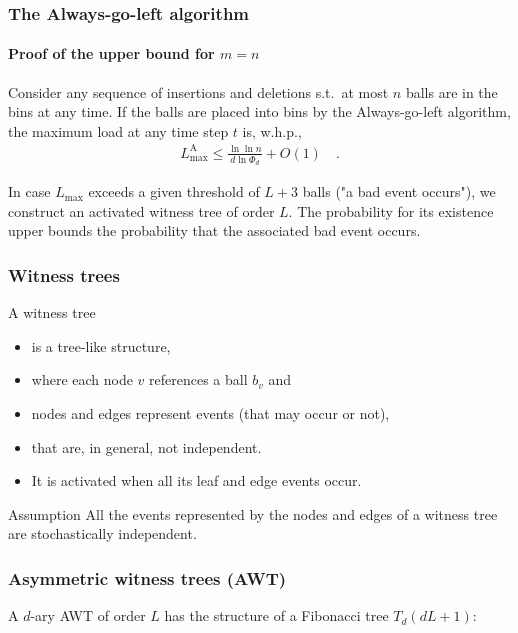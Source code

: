 \documentclass[serif,professionalfonts]{beamer}
\newcommand\load{L_{\mathrm{max}}}
\newcommand\loadAgl{\load^{\mathrm{A}}}
\begin{document}
\begin{frame}
\frametitle{The Always-go-left algorithm}
\framesubtitle{Proof of the upper bound for $m=n$}
\begin{theorem}[V\"ocking, 2003]
\label{theorem:aglm}
Consider any sequence of insertions and deletions s.t.~at most $n$ balls are in the bins at any time. If the balls are placed into bins by the Always-go-left algorithm, the maximum load at any time step $t$ is, w.h.p., 
\begin{align*}
\loadAgl \leq \frac{\ln\ln n}{d  \ln \Phi_d} + O(1) \quad .
\end{align*}
\end{theorem}

\pause
\bigskip
In case $\load$ exceeds a given threshold of $L+3$ balls ("a bad event occurs"), we construct an activated \alert{witness tree of order $L$}. The probability for its existence upper bounds the probability that the associated bad event occurs.  
\end{frame}

\newcommand\assumptionOne{
\begin{alertblock}{Assumption}
All the events represented by the nodes and edges of a witness tree are stochastically independent. 
\end{alertblock}
}

\begin{frame}
\frametitle{Witness trees}
A witness tree
\begin{itemize}
\item is a \alert{tree-like structure},
\item where each node $v$ references a ball $b_v$ and
\item nodes and edges represent \alert{events} (that may occur or not),
\item that are, in general, \alert{not independent}.
\item It is \alert{activated} when all its leaf and edge events occur. 
\end{itemize}

\bigskip
\assumptionOne
\end{frame}

\begin{frame}
\frametitle{Asymmetric witness trees (AWT)} 
A $d$-ary AWT of order $L$ has the structure of a Fibonacci tree $T_d(dL+1)$:

\begin{center}
\end{center}
\end{frame}
\end{document}

